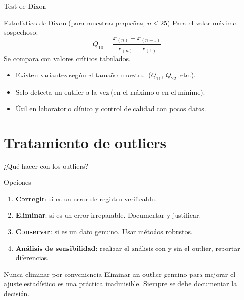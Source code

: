 \documentclass[aspectratio=169]{beamer}
\begin{document}
\begin{frame}{Test de Dixon}
  \begin{block}{Estadístico de Dixon (para muestras pequeñas, $n \le 25$)}
    Para el valor máximo sospechoso:
    \[
      Q_{10} = \frac{x_{(n)} - x_{(n-1)}}{x_{(n)} - x_{(1)}}
    \]
    Se compara con valores críticos tabulados.
  \end{block}
  \bigskip
  \begin{itemize}
    \item Existen variantes según el tamaño muestral ($Q_{11}$, $Q_{22}$, etc.).
    \item Solo detecta un outlier a la vez (en el máximo o en el mínimo).
    \item Útil en laboratorio clínico y control de calidad con pocos datos.
  \end{itemize}
\end{frame}

\section{Tratamiento de outliers}

\begin{frame}{¿Qué hacer con los outliers?}
  \begin{block}{Opciones}
    \begin{enumerate}
      \item \textbf{Corregir}: si es un error de registro verificable.
      \item \textbf{Eliminar}: si es un error irreparable. Documentar y justificar.
      \item \textbf{Conservar}: si es un dato genuino. Usar métodos robustos.
      \item \textbf{Análisis de sensibilidad}: realizar el análisis con y sin el outlier, reportar diferencias.
    \end{enumerate}
  \end{block}
  \bigskip
  \begin{alertblock}{Nunca eliminar por conveniencia}
    Eliminar un outlier genuino para mejorar el ajuste estadístico es una práctica inadmisible. Siempre se debe documentar la decisión.
  \end{alertblock}
\end{frame}
\end{document}
